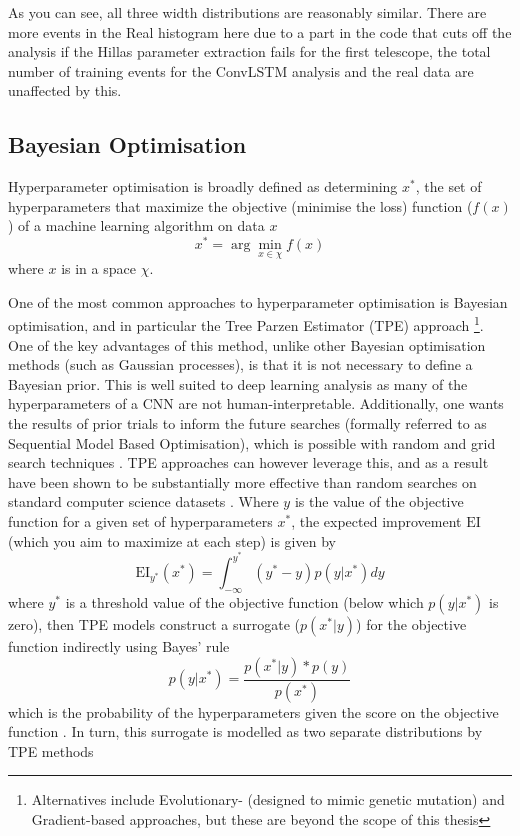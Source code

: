 As you can see, all three width distributions are reasonably similar. There are more events in the Real histogram here due to a part in the code that cuts off the analysis if the Hillas parameter extraction fails for the first telescope, the total number of training events for the ConvLSTM analysis and the real data are unaffected by this.

\subsection{Bayesian Optimisation}

Hyperparameter optimisation is broadly defined as determining $x^*$, the set of hyperparameters that maximize the objective (minimise the loss) function ($f(x)$) of a machine learning algorithm on  data $x$ \begin{equation}
    x^*=\arg \min_{x \in \chi} f(x)
\end{equation}
where $x$ is in a space $\chi$.

One of the most common approaches to hyperparameter optimisation is Bayesian optimisation, and in particular the Tree Parzen Estimator (TPE) approach \cite{bergestra}\cite{tdshyper} \footnote{Alternatives include Evolutionary- (designed to mimic genetic mutation) and Gradient-based approaches, but these are beyond the scope of this thesis}. One of the key advantages of this method, unlike other Bayesian optimisation methods (such as Gaussian processes), is that it is not necessary to define a Bayesian prior. This is well suited to deep learning analysis as many of the hyperparameters of a CNN are not human-interpretable. Additionally, one wants the results of prior trials to inform the future searches (formally referred to as Sequential Model Based Optimisation), which is possible with random and grid search techniques \cite{tdshyper}. TPE approaches can however leverage this, and as a result have been shown to be substantially more effective than random searches on standard computer science datasets \cite{bergestra}. Where $y$ is the value of the objective function for a given set of hyperparameters $x^*$, the expected improvement $\textrm{EI}$ (which you aim to maximize at each step) is given by
\begin{equation}
    \textrm{EI}_{y^*}(x^*)=\int_{-\infty}^{y^*}(y^*-y)p(y|x^*)dy
\end{equation}
where $y^*$ is a threshold value of the objective function (below which $p(y|x^*)$ is zero), then TPE models construct a surrogate ($p(x^*|y)$) for the objective function indirectly using Bayes' rule
\begin{equation}
    p(y|x^*)=\frac{p(x^*|y)*p(y)}{p(x^*)}
\end{equation}
which is the probability of the hyperparameters given the score on the objective function \cite{tdshyper}. In turn, this surrogate is modelled as two separate distributions by TPE methods

